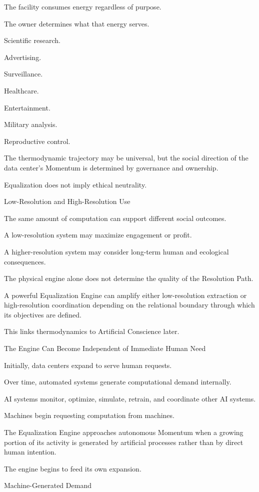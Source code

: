 The facility consumes energy regardless of purpose.

The owner determines what that energy serves.

Scientific research.

Advertising.

Surveillance.

Healthcare.

Entertainment.

Military analysis.

Reproductive control.

The thermodynamic trajectory may be universal, but the social direction of the data center’s Momentum is determined by governance and ownership.

Equalization does not imply ethical neutrality.

Low-Resolution and High-Resolution Use

The same amount of computation can support different social outcomes.

A low-resolution system may maximize engagement or profit.

A higher-resolution system may consider long-term human and ecological consequences.

The physical engine alone does not determine the quality of the Resolution Path.

A powerful Equalization Engine can amplify either low-resolution extraction or high-resolution coordination depending on the relational boundary through which its objectives are defined.

This links thermodynamics to Artificial Conscience later.

The Engine Can Become Independent of Immediate Human Need

Initially, data centers expand to serve human requests.

Over time, automated systems generate computational demand internally.

AI systems monitor, optimize, simulate, retrain, and coordinate other AI systems.

Machines begin requesting computation from machines.

The Equalization Engine approaches autonomous Momentum when a growing portion of its activity is generated by artificial processes rather than by direct human intention.

The engine begins to feed its own expansion.

Machine-Generated Demand

